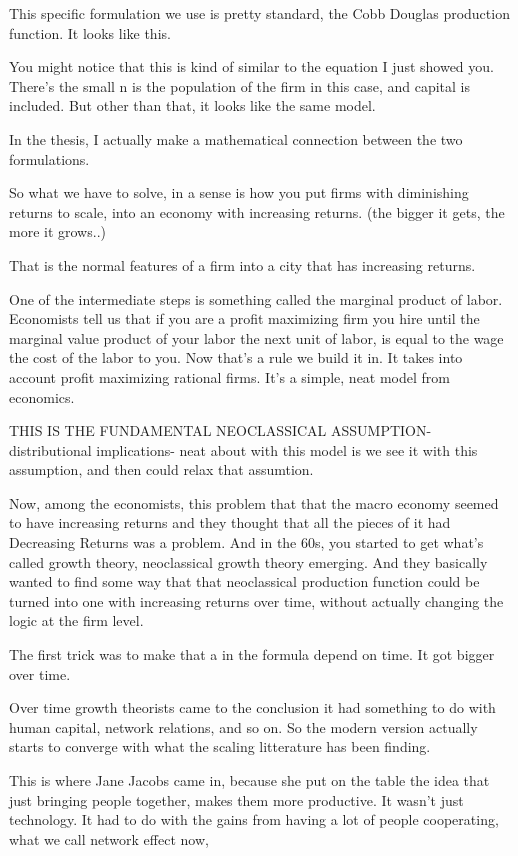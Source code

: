 This specific formulation we use is pretty standard, the Cobb Douglas production function.  It looks like this.

You might notice that this is kind of similar to the equation I just showed you. There's the small n is the population of the firm in this case, and capital is included. But other than that, it looks like the same model. 

In the thesis, I actually make a mathematical connection between the two formulations.

So what we have to solve, in a sense is how you put firms with diminishing returns to scale, into an economy with increasing returns. (the bigger it gets, the more it grows..)

That is the normal features of a firm into a city that has increasing returns.

One of the intermediate steps is something called the marginal product of labor. Economists tell us that if you are a profit maximizing firm you hire until the marginal value product of your labor the next unit of labor, is equal to the wage the cost of the labor to you. Now that's a rule we build it in. It takes into account profit maximizing rational firms. It's a simple, neat model from economics.

THIS IS THE FUNDAMENTAL NEOCLASSICAL ASSUMPTION- distributional implications- neat about with this model is we see it with this assumption, and then could relax that assumtion. 

Now, among the economists, this problem that that the macro economy seemed to have increasing returns and they thought that all the pieces of it had Decreasing Returns was a problem. And in the 60s, you started to get what's called growth theory, neoclassical growth theory emerging. And they basically wanted to find some way that that neoclassical production function could be turned into one with increasing returns over time, without actually changing the logic at the firm level.


The first trick was to make that a in the formula depend on time. It got bigger over time.

Over time  growth theorists came to the conclusion it had something to do with human capital, network relations, and so on. So the modern version actually starts to converge with what the scaling litterature has been finding. 

This is where Jane Jacobs came in, because she put on the table the idea that just bringing people together, makes them more productive. It wasn't just technology. It had to do with the gains from having a lot of people cooperating,  what we call  network effect now, 

